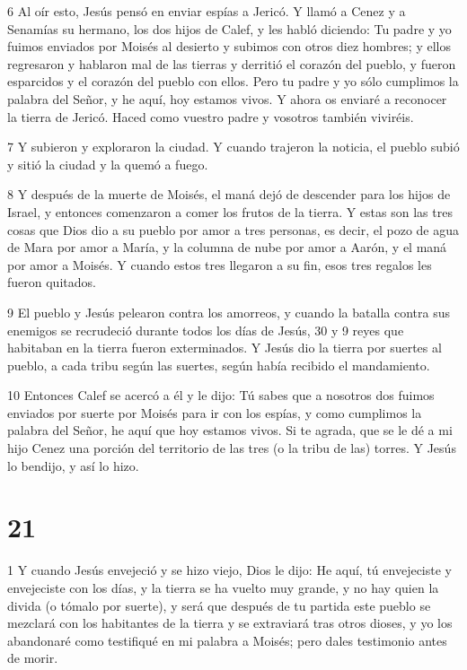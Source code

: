 \par 6 Al oír esto, Jesús pensó en enviar espías a Jericó. Y llamó a Cenez y a Senamías su hermano, los dos hijos de Calef, y les habló diciendo: Tu padre y yo fuimos enviados por Moisés al desierto y subimos con otros diez hombres; y ellos regresaron y hablaron mal de las tierras y derritió el corazón del pueblo, y fueron esparcidos y el corazón del pueblo con ellos. Pero tu padre y yo sólo cumplimos la palabra del Señor, y he aquí, hoy estamos vivos. Y ahora os enviaré a reconocer la tierra de Jericó. Haced como vuestro padre y vosotros también viviréis.

\par 7 Y subieron y exploraron la ciudad. Y cuando trajeron la noticia, el pueblo subió y sitió la ciudad y la quemó a fuego.

\par 8 Y después de la muerte de Moisés, el maná dejó de descender para los hijos de Israel, y entonces comenzaron a comer los frutos de la tierra. Y estas son las tres cosas que Dios dio a su pueblo por amor a tres personas, es decir, el pozo de agua de Mara por amor a María, y la columna de nube por amor a Aarón, y el maná por amor a Moisés. Y cuando estos tres llegaron a su fin, esos tres regalos les fueron quitados.

\par 9 El pueblo y Jesús pelearon contra los amorreos, y cuando la batalla contra sus enemigos se recrudeció durante todos los días de Jesús, 30 y 9 reyes que habitaban en la tierra fueron exterminados. Y Jesús dio la tierra por suertes al pueblo, a cada tribu según las suertes, según había recibido el mandamiento.

\par 10 Entonces Calef se acercó a él y le dijo: Tú sabes que a nosotros dos fuimos enviados por suerte por Moisés para ir con los espías, y como cumplimos la palabra del Señor, he aquí que hoy estamos vivos. Si te agrada, que se le dé a mi hijo Cenez una porción del territorio de las tres (o la tribu de las) torres. Y Jesús lo bendijo, y así lo hizo.

\chapter{21}

\par 1 Y cuando Jesús envejeció y se hizo viejo, Dios le dijo: He aquí, tú envejeciste y envejeciste con los días, y la tierra se ha vuelto muy grande, y no hay quien la divida (o tómalo por suerte), y será que después de tu partida este pueblo se mezclará con los habitantes de la tierra y se extraviará tras otros dioses, y yo los abandonaré como testifiqué en mi palabra a Moisés; pero dales testimonio antes de morir.

